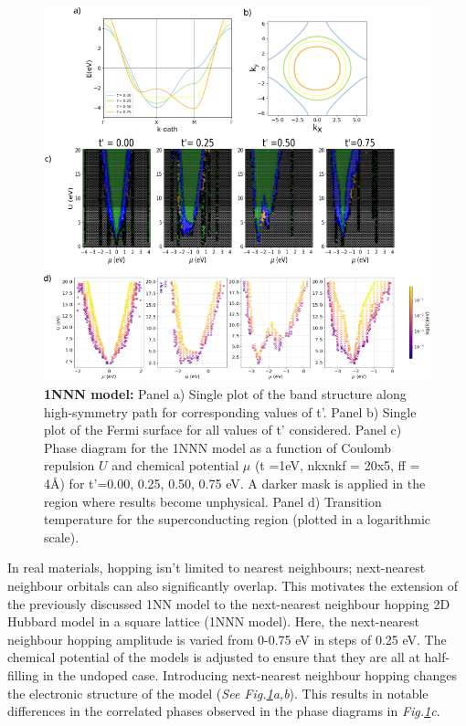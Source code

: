 \documentclass[11pt]{article}
\begin{document}
\begin{figure}[htbp]  %
    \centering
    \includegraphics[width=1.0\textwidth]{1NNN.png}  %
    \caption{\textbf{1NNN model:} Panel a) Single plot of the band structure along high-symmetry path for corresponding values of t'.
    Panel b) Single plot of the Fermi surface for all values of t' considered.
    Panel c) Phase diagram for the 1NNN model as a function of Coulomb repulsion $U$ and chemical potential $\mu$ (t =1eV, nkxnkf = 20x5, ff = 4\AA) for t'=0.00, 0.25, 0.50, 0.75 eV. 
    A darker mask is applied in the region where results become unphysical.
    Panel d) Transition temperature for the superconducting region (plotted in a logarithmic scale).
   }
    
    \label{fig:1NNN}
\end{figure}

In real materials, hopping isn't limited to nearest neighbours; next-nearest neighbour orbitals can also significantly overlap. This motivates the extension of the previously
discussed 1NN model to the next-nearest neighbour hopping 2D Hubbard model in a square lattice (1NNN model). 
Here, the next-nearest neighbour hopping amplitude is varied from 0-0.75 eV in steps of 0.25 eV.
The chemical potential of the models is adjusted to ensure that they are all
at half-filling in the undoped case. Introducing next-nearest neighbour hopping 
changes the electronic structure of the model (\textit{See Fig.\ref{fig:1NNN}a,b}). This results in notable
differences in the correlated phases observed in the phase diagrams in \textit{Fig.\ref{fig:1NNN}c}.\par
\medskip
\end{document}
